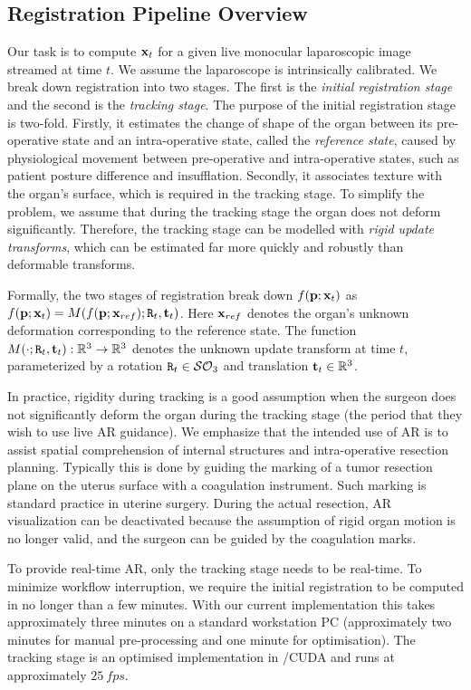 \subsection{Registration Pipeline Overview}
\label{sec:globalOverview}
Our task is to compute $\mathbf{x}_t$ for a given live monocular laparoscopic image streamed at time $t$. We assume the laparoscope is intrinsically calibrated.
We break down registration into two stages. The first is the \textit{initial registration stage} and the second is the \emph{tracking stage}. The purpose of the initial registration stage is two-fold. Firstly, it estimates the change of shape of the organ between its pre-operative state and an intra-operative state, called the \emph{reference state}, caused by physiological movement between pre-operative and intra-operative states, such as patient posture difference and insufflation. Secondly, it associates texture with the organ's surface, which is required in the tracking stage.
To simplify the problem, we assume that during the tracking stage the organ does not deform significantly. Therefore, the tracking stage can be modelled with \emph{rigid update transforms}, which can be estimated far more quickly and robustly than deformable transforms. 

Formally, the two stages of registration break down $f(\mathbf{p};\mathbf{x}_t)$ as $f(\vet{p};\vet{x}_{t})=M(f(\vet{p};\vet{x}_{ref});\mat{R}_{t},\vet{t}_{t})$. Here $\mathbf{x}_{ref}$ denotes the organ's unknown deformation corresponding to the reference state.
The function $M(\cdot;\mat{R}_{t},\vet{t}_{t}):\mathbb{R}^3\rightarrow \mathbb{R}^3$ denotes the unknown update transform at time $t$, parameterized by a rotation $\mat{R}_{t}\in \mathcal{SO}_{3}$ and translation $\mathbf{t}_{t}\in \mathbb{R}^3$.

In practice, rigidity during tracking is a good assumption when the surgeon does not significantly deform the organ during the tracking stage (\ie the period that they wish to use live AR guidance). We emphasize that the intended use of AR is to assist spatial comprehension of internal structures and intra-operative resection planning. Typically this is done by guiding the marking of a tumor resection plane on the uterus surface with a coagulation instrument. Such marking is standard practice in uterine surgery. During the actual resection, AR visualization can be deactivated because the assumption of rigid organ motion is no longer valid, and the surgeon can be guided by the coagulation marks.

To provide real-time AR, only the tracking stage needs to be real-time. To minimize workflow interruption, we require the initial registration to be computed in no longer than a few minutes. With our current implementation this takes approximately three minutes on a standard workstation PC (approximately two minutes for manual pre-processing and one minute for optimisation). 
The tracking stage is an optimised implementation in \CC/CUDA and runs at approximately $\SI{25}{fps}$.